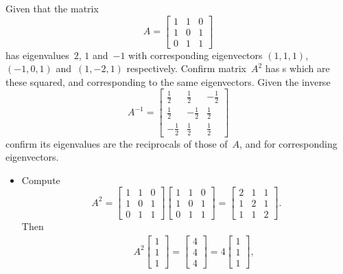 \begin{example} \label{eg:3x3sympow}
Given that the matrix 
\begin{equation*}
A=\begin{bmatrix} 1&1&0\\1&0&1\\0&1&1 \end{bmatrix}
\end{equation*}
has eigenvalues~\(2\), \(1\) and~\(-1\) with corresponding eigenvectors \((1,1,1)\), \((-1,0,1)\) and~\((1,-2,1)\) respectively.
Confirm matrix~\(A^2\) has s which are these squared, and corresponding to the same eigenvectors.
Given the inverse
\begin{equation*}
A^{-1}=\begin{bmatrix} \tfrac12&\tfrac12&-\tfrac12
\\\tfrac12&-\tfrac12&\tfrac12
\\-\tfrac12&\tfrac12&\tfrac12 \end{bmatrix}
\end{equation*}
confirm its eigenvalues are the reciprocals of those of~\(A\), and for corresponding eigenvectors.
\begin{solution} 
\begin{itemize}
\item Compute
\begin{equation*}
A^2=\begin{bmatrix} 1&1&0\\1&0&1\\0&1&1 \end{bmatrix}
\begin{bmatrix} 1&1&0\\1&0&1\\0&1&1 \end{bmatrix}
=\begin{bmatrix} 2&1&1\\1&2&1\\1&1&2 \end{bmatrix}.
\end{equation*}
Then
\begin{eqnarray*}
&&A^2\begin{bmatrix} 1\\1\\1 \end{bmatrix}
=\begin{bmatrix} 4\\4\\4 \end{bmatrix}
=4\begin{bmatrix} 1\\1\\1 \end{bmatrix},

\end{eqnarray*}
\end{itemize}
\end{solution}
\end{example}
